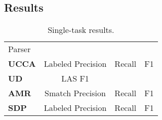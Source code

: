 \documentclass[11pt,a4paper]{article}
\begin{document}
\subsection{Results}\label{sec:results}


\begin{table}\label{tab:single}
\begin{tabular}{lccc}
Parser \\
\textbf{UCCA} & Labeled Precision & Recall & F1 \\
\textbf{UD} & LAS F1 \\
\textbf{AMR} & Smatch Precision & Recall & F1 \\
\textbf{SDP} & Labeled Precision & Recall & F1 \\
\end{tabular}
\caption{Single-task results.}
\end{table}




\end{document}
